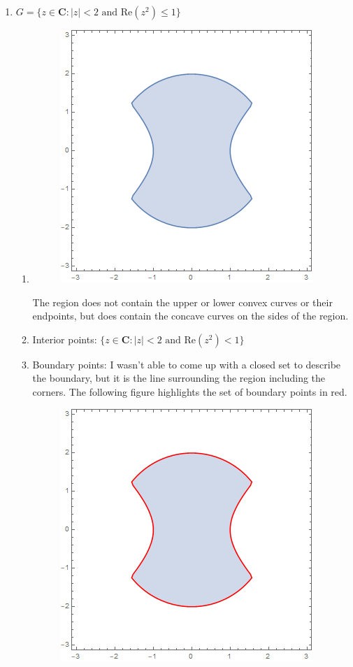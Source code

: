 \documentclass{article}
\newcommand{\C}{\mathbf{C}}
\newcommand{\Real}{\text{Re}}
\begin{document}
\begin{enumerate}

	\item $G = \{z \in \C: |z|<2 \text{ and } \Real(z^2)\leq 1 \}$
		\begin{enumerate}
			\item {}
			\begin{figure}[H]
			\includegraphics[scale=0.5]{image1.png}
			\end{figure}
			The region does not contain the upper or lower convex curves or their endpoints, but does contain the concave curves on the sides of the region.
			
			\item Interior points: $\{z \in \C: |z|<2 \text{ and } \Real(z^2) < 1 \}$
			\item Boundary points: I wasn't able to come up with a closed set to describe the boundary, but it is the line surrounding the region including the corners. The following figure highlights the set of boundary points in red.
			
			\begin{figure}[H]
			\includegraphics[scale=0.4]{image2.png}
			\end{figure}
			

\end{enumerate}
\end{enumerate}
\end{document}
